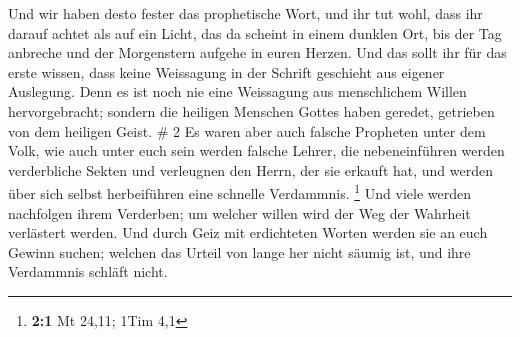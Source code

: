  Und wir haben desto fester das prophetische Wort, und ihr
tut wohl, dass ihr darauf achtet als auf ein Licht, das da scheint in
einem dunklen Ort, bis der Tag anbreche und der Morgenstern aufgehe in
euren Herzen.  Und das sollt ihr für das erste wissen, dass
keine Weissagung in der Schrift geschieht aus eigener Auslegung.
 Denn es ist noch nie eine Weissagung aus menschlichem
Willen hervorgebracht; sondern die heiligen Menschen Gottes haben
geredet, getrieben von dem heiligen Geist. \# 2  Es waren
aber auch falsche Propheten unter dem Volk, wie auch unter euch sein
werden falsche Lehrer, die nebeneinführen werden verderbliche Sekten und
verleugnen den Herrn, der sie erkauft hat, und werden über sich selbst
herbeiführen eine schnelle Verdammnis. \footnote{\textbf{2:1} Mt 24,11;
  1Tim 4,1}  Und viele werden nachfolgen ihrem Verderben; um
welcher willen wird der Weg der Wahrheit verlästert werden. 
Und durch Geiz mit erdichteten Worten werden sie an euch Gewinn suchen;
welchen das Urteil von lange her nicht säumig ist, und ihre Verdammnis
schläft nicht.

